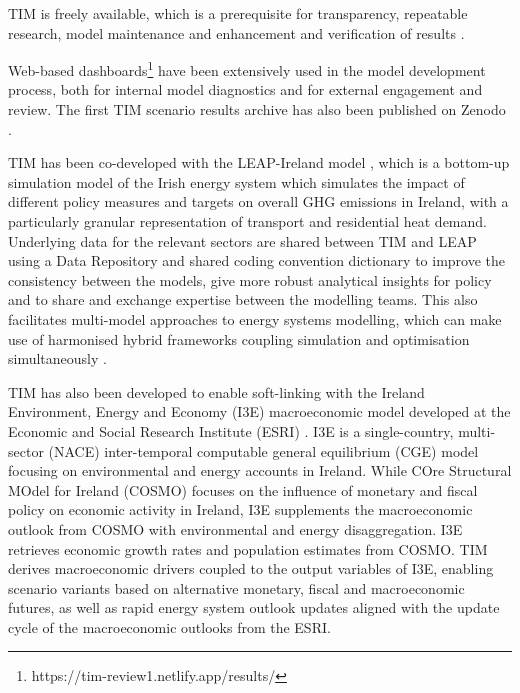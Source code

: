 \documentclass[gmd,manuscript]{copernicus}
\begin{document}
TIM is freely available, which is a prerequisite for transparency, repeatable research, model maintenance and enhancement and verification of results \citep{Pfenninger2018}. 

Web-based dashboards\footnote{https://tim-review1.netlify.app/results/} have been extensively used in the model development process, both for internal model diagnostics and for external engagement and review. The first TIM scenario results archive has also been published on Zenodo \citep{HannahDaly2021}.

TIM has been co-developed with the LEAP-Ireland model \citep{MacUidhir2020}, which is a bottom-up simulation model of the Irish energy system which simulates the impact of different policy measures and targets on overall GHG emissions in Ireland, with a particularly granular representation of transport and residential heat demand. Underlying data for the relevant sectors are shared between TIM and LEAP using a Data Repository and shared coding convention dictionary to improve the consistency between the models, give more robust analytical insights for policy and to share and exchange expertise between the modelling teams. This also facilitates multi-model approaches to energy systems modelling, which can make use of harmonised hybrid frameworks coupling simulation and optimisation simultaneously \citep{rogan2014leaps}.

TIM has also been developed to enable soft-linking with the Ireland Environment, Energy and Economy (I3E) macroeconomic model developed at the Economic and Social Research Institute (ESRI) \citep{Yakut2020}. I3E is a single-country, multi-sector (NACE) inter-temporal computable general equilibrium (CGE) model focusing on environmental and energy accounts in Ireland. While COre Structural MOdel for Ireland (COSMO) focuses on the influence of monetary and fiscal policy on economic activity in Ireland, I3E supplements the macroeconomic outlook from COSMO with environmental and energy disaggregation. I3E retrieves economic growth rates and population estimates from COSMO. TIM derives macroeconomic drivers coupled to the output variables of I3E, enabling scenario variants based on alternative monetary, fiscal and macroeconomic futures, as well as rapid energy system outlook updates aligned with the update cycle of the macroeconomic outlooks from the ESRI.

\end{document}
